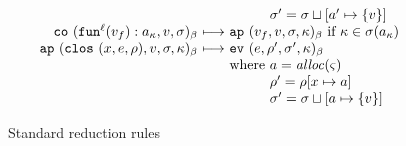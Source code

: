 \documentclass[preprint,onecolumn,9pt]{sigplanconf} %
\begin{document}
\begin{figure*}
\begin{gather*}
\begin{array}{@{}r@{\ }c@{\ }l@{}}
      &&\phantom{\text{where }} \msto' = \ext{\msto}{\maddr'}{\setof{\mval}} \\
      \co{\spush{\kfn[^\mlab]{\mval_f}}{\mkaddr}, \mval, \msto}{\mmlab} &\machstep&
      \ap{\mval_f, \mval, \msto, \mkont}{\mmlab} \text{ if } \mkont \in \msto(\mkaddr)
      \\
      \ap{\clos{\mvar, \mexp, \menv}, \mval, \msto, \mkont}{\mmlab} &\machstep&
      \ev{\mexp, \menv', \msto', \mkont}{\mmlab} \\
      &&\text{where } \maddr = \alloc(\mstate) \\
      &&\phantom{\text{where }} \menv' = \menv[\mvar \mapsto \maddr] \\
      &&\phantom{\text{where }} \msto' = \ext{\msto}{\maddr}{\setof{\mval}}
    \end{array}    
  \end{gather*}
  \caption{Standard reduction rules}
  \label{fig:standard}
\end{figure*}
\end{document}
